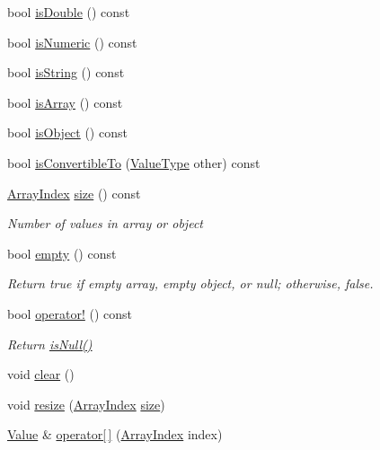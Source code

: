 \begin{DoxyCompactItemize}
\item 
bool \hyperlink{class_json_1_1_value_a4a2e2a790e19a1c09fc5dd12d7ad47b5}{is\+Double} () const
\item 
bool \hyperlink{class_json_1_1_value_af961a000cd203c895e44c195ab39b866}{is\+Numeric} () const
\item 
bool \hyperlink{class_json_1_1_value_a71e1f82cf1c3eaf969d400dcffb163a6}{is\+String} () const
\item 
bool \hyperlink{class_json_1_1_value_a1627eb9d6568d6d0252fa8bb711c0a59}{is\+Array} () const
\item 
bool \hyperlink{class_json_1_1_value_a8cf96c0f2a552051fcfc78ffee60e037}{is\+Object} () const
\item 
bool \hyperlink{class_json_1_1_value_af1ee6be27a96a7d12128efdd60deb54d}{is\+Convertible\+To} (\hyperlink{namespace_json_a7d654b75c16a57007925868e38212b4e}{Value\+Type} other) const
\item 
\hyperlink{class_json_1_1_value_a184a91566cccca7b819240f0d5561c7d}{Array\+Index} \hyperlink{class_json_1_1_value_a0ec2808e1d7efa4e9fad938d6667be44}{size} () const
\begin{DoxyCompactList}\small\item\em Number of values in array or object \end{DoxyCompactList}\item 
bool \hyperlink{class_json_1_1_value_a0519a551e37ee6665d74742b3f96bab3}{empty} () const
\begin{DoxyCompactList}\small\item\em Return true if empty array, empty object, or null; otherwise, false. \end{DoxyCompactList}\item 
bool \hyperlink{class_json_1_1_value_a731b89fb4764c39ce2328e1707c822b9}{operator!} () const
\begin{DoxyCompactList}\small\item\em Return \hyperlink{class_json_1_1_value_abde4070e21e46dc4f8203f66582cb19f}{is\+Null()} \end{DoxyCompactList}\item 
void \hyperlink{class_json_1_1_value_a501a4d67e6c875255c2ecc03ccd2019b}{clear} ()
\item 
void \hyperlink{class_json_1_1_value_aa284353271ada427dbfa04a42f2be407}{resize} (\hyperlink{class_json_1_1_value_a184a91566cccca7b819240f0d5561c7d}{Array\+Index} \hyperlink{class_json_1_1_value_a0ec2808e1d7efa4e9fad938d6667be44}{size})
\item 
\hyperlink{class_json_1_1_value}{Value} \& \hyperlink{class_json_1_1_value_a7d99f5dba388cdaa152ce6ef933d64ef}{operator\mbox{[}$\,$\mbox{]}} (\hyperlink{class_json_1_1_value_a184a91566cccca7b819240f0d5561c7d}{Array\+Index} index)

\end{DoxyCompactItemize}
